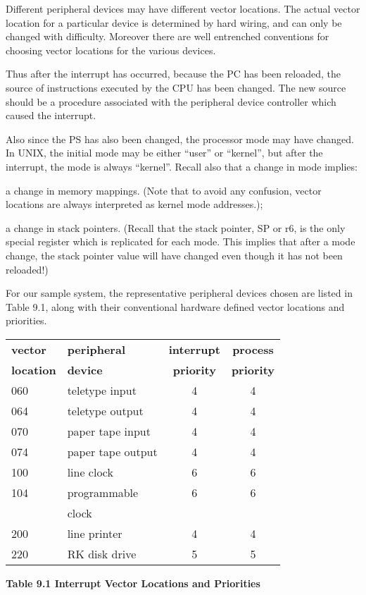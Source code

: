 Different peripheral devices may have
different vector locations. The actual
vector location for a particular device
is determined by hard wiring, and can
only be changed with difficulty. Moreover there are well entrenched conventions for choosing vector locations for
the various devices.

Thus after the interrupt has occurred,
because the PC has been reloaded, the
source of instructions executed by the
CPU has been changed. The new source
should be a procedure associated with
the peripheral device controller which
caused the interrupt.


Also since the PS has also been
changed, the processor mode may have
changed. In UNIX, the initial mode may
be either ``user'' or ``kernel'', but after
the interrupt, the mode is always ``kernel''. Recall also that a change in mode
implies:

\bd
\item[(a)] a change in memory mappings.
(Note that to avoid any confusion, vector locations are
always interpreted as kernel
mode addresses.);

\item[(b)] a change in stack pointers.
 (Recall that the stack pointer,
SP or r6, is the only special
register which is replicated for
each mode. This implies that
after a mode change, the stack
pointer value will have changed
even though it has not been
reloaded!)
\ed


For our sample system, the representative peripheral devices chosen are
listed in Table 9.1, along with their
conventional hardware defined vector
locations and priorities.

\begin{center}
\begin{tabular}{llcc}
{\bf vector} & {\bf peripheral} & {\bf interrupt} & {\bf process} \\
{\bf location} & {\bf device} & {\bf priority} & {\bf priority} \\ \hline
060 & teletype input & 4 & 4 \\
064 & teletype output & 4 & 4 \\
070 & paper tape input & 4 & 4 \\
074 & paper tape output & 4 & 4 \\
100 & line clock & 6 & 6 \\
104 & programmable & 6 & 6 \\
    & clock & &\\
200 & line printer & 4 & 4 \\
220 & RK disk drive & 5 & 5 \\
\end{tabular}
\bigskip

{\bf Table 9.1 Interrupt Vector Locations and Priorities}
\end{center}

